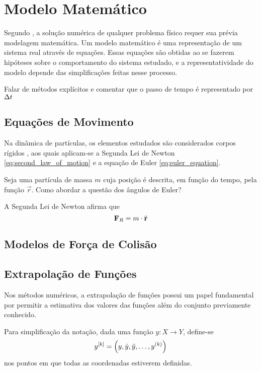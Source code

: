 \chapter{Modelo Matemático}

Segundo , a solução numérica de qualquer problema físico requer sua prévia modelagem matemática. Um modelo matemático é uma representação de um sistema real através de equações. Essas equações são obtidas ao se fazerem hipóteses sobre o comportamento do sistema estudado, e a representatividade do modelo depende das simplificações feitas nesse processo.

\alert{Falar de métodos explícitos e comentar que o passo de tempo é representado por \(\Delta t\)}

\section{Equações de Movimento}

Na dinâmica de partículas, os elementos estudados são considerados corpos rígidos , aos quais aplicam-se a Segunda Lei de Newton \eqref{eq:second_law_of_motion} e a equação de Euler \eqref{eq:euler_equation}.

Seja \particle{} uma partícula de massa \(m\) cuja posição é descrita, em função do tempo, pela função \(\vec{r}\).  \alert{Como abordar a questão dos ângulos de Euler?}

A Segunda Lei de Newton afirma que
\begin{equation} \label{eq:second_law_of_motion}
	\vec{F}_R = m\cdot\deriv{2}{\vec{r}} 
\end{equation}

\section{Modelos de Força de Colisão}

\section{Extrapolação de Funções}
\label{sec:extrapolation}

Nos métodos numéricos, a extrapolação de funções possui um papel fundamental por permitir a estimativa dos valores das funções além do conjunto previamente conhecido.

Para simplificação da notação, dada uma função \(y: X\to Y\), define-se
\[\drvec{k}{y} = \pqty{y, \deriv{1}{y}, \deriv{2}{y}, \dots, \deriv{k}{y}}\]
nos pontos em que todas as coordenadas estiverem definidas.

